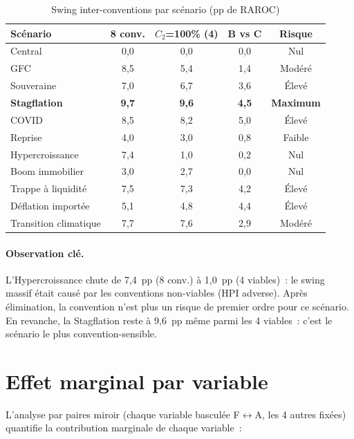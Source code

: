 \documentclass[12pt, a4paper, twoside, openright]{report}
\theoremstyle{definition}
\begin{document}
\begin{table}[htbp]
\centering
\caption{Swing inter-conventions par scénario (pp de RAROC)}
\label{tab:swing-conv}
\begin{tabular}{lcccc}
\toprule
\textbf{Scénario} & \textbf{8 conv.} & \textbf{$C_2$=100\% (4)} & \textbf{B vs C} & \textbf{Risque} \\
\midrule
Central & 0,0 & 0,0 & 0,0 & Nul \\
GFC & 8,5 & 5,4 & 1,4 & Modéré \\
Souveraine & 7,0 & 6,7 & 3,6 & Élevé \\
\textbf{Stagflation} & \textbf{9,7} & \textbf{9,6} & \textbf{4,5} & \textbf{Maximum} \\
COVID & 8,5 & 8,2 & 5,0 & Élevé \\
Reprise & 4,0 & 3,0 & 0,8 & Faible \\
Hypercroissance & 7,4 & 1,0 & 0,2 & Nul \\
Boom immobilier & 3,0 & 2,7 & 0,0 & Nul \\
Trappe à liquidité & 7,5 & 7,3 & 4,2 & Élevé \\
Déflation importée & 5,1 & 4,8 & 4,4 & Élevé \\
Transition climatique & 7,7 & 7,6 & 2,9 & Modéré \\
\bottomrule
\end{tabular}
\end{table}

\paragraph{Observation clé.} L'Hypercroissance chute de 7,4~pp (8 conv.) à 1,0~pp (4 viables)~: le swing massif était causé par les conventions non-viables (HPI adverse). Après élimination, la convention n'est plus un risque de premier ordre pour ce scénario. En revanche, la Stagflation reste à 9,6~pp même parmi les 4 viables~: c'est le scénario le plus convention-sensible.


\section{Effet marginal par variable}
\label{sec:conv-marginal}

L'analyse par paires miroir (chaque variable basculée F$\leftrightarrow$A, les 4 autres fixées) quantifie la contribution marginale de chaque variable~:
\end{document}
